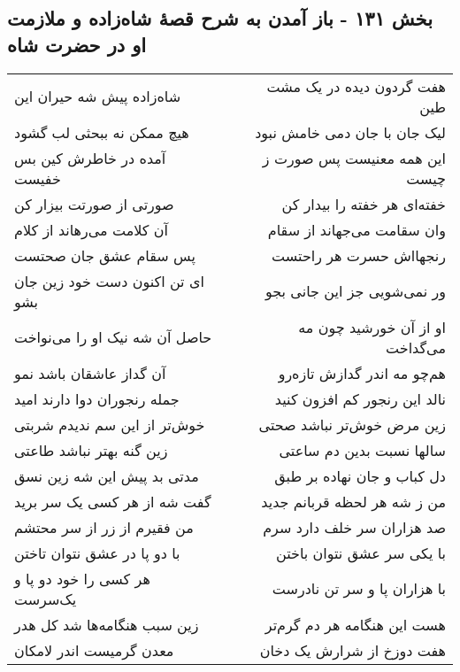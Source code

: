 \begin{center}
\section*{بخش ۱۳۱ - باز آمدن به شرح قصهٔ شاه‌زاده و ملازمت او در حضرت شاه}
\label{sec:sh131}
\begin{longtable}{l p{0.5cm} r}
شاه‌زاده پیش شه حیران این
&&
هفت گردون دیده در یک مشت طین
\\
هیچ ممکن نه ببحثی لب گشود
&&
لیک جان با جان دمی خامش نبود
\\
آمده در خاطرش کین بس خفیست
&&
این همه معنیست پس صورت ز چیست
\\
صورتی از صورتت بیزار کن
&&
خفته‌ای هر خفته را بیدار کن
\\
آن کلامت می‌رهاند از کلام
&&
وان سقامت می‌جهاند از سقام
\\
پس سقام عشق جان صحتست
&&
رنجهااش حسرت هر راحتست
\\
ای تن اکنون دست خود زین جان بشو
&&
ور نمی‌شویی جز این جانی بجو
\\
حاصل آن شه نیک او را می‌نواخت
&&
او از آن خورشید چون مه می‌گداخت
\\
آن گداز عاشقان باشد نمو
&&
هم‌چو مه اندر گدازش تازه‌رو
\\
جمله رنجوران دوا دارند امید
&&
نالد این رنجور کم افزون کنید
\\
خوش‌تر از این سم ندیدم شربتی
&&
زین مرض خوش‌تر نباشد صحتی
\\
زین گنه بهتر نباشد طاعتی
&&
سالها نسبت بدین دم ساعتی
\\
مدتی بد پیش این شه زین نسق
&&
دل کباب و جان نهاده بر طبق
\\
گفت شه از هر کسی یک سر برید
&&
من ز شه هر لحظه قربانم جدید
\\
من فقیرم از زر از سر محتشم
&&
صد هزاران سر خلف دارد سرم
\\
با دو پا در عشق نتوان تاختن
&&
با یکی سر عشق نتوان باختن
\\
هر کسی را خود دو پا و یک‌سرست
&&
با هزاران پا و سر تن نادرست
\\
زین سبب هنگامه‌ها شد کل هدر
&&
هست این هنگامه هر دم گرم‌تر
\\
معدن گرمیست اندر لامکان
&&
هفت دوزخ از شرارش یک دخان
\\
\end{longtable}
\end{center}
